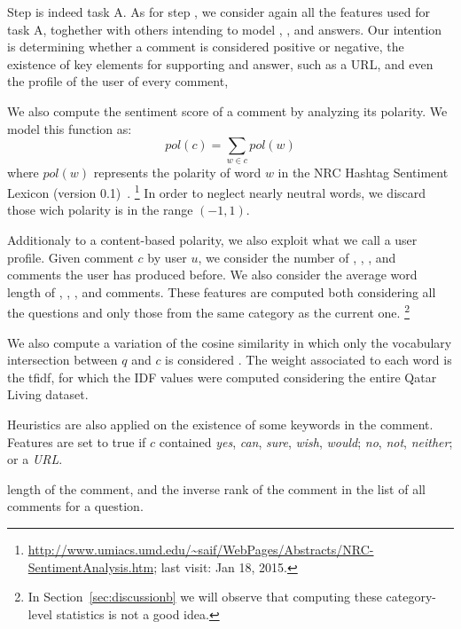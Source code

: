 Step \Ni is indeed task A. As for step \Nii, we consider again all the 
features used  for task A, toghether with others intending to model \yes, 
\no, and \unsure answers. Our intention is determining whether a comment is 
considered positive or negative, the existence of key elements for supporting 
and answer, such as a URL, and even the profile of the user of every comment, 

We also compute the sentiment score of a comment by analyzing its polarity. We 
model this function as:
\begin{equation}
pol(c) = \sum_{w\in c} pol(w) 
\end{equation}
%
where $pol(w)$ represents the polarity of word $w$ in the NRC Hashtag Sentiment 
Lexicon (version 0.1)~\cite{MohammadKZ2013}.%
\footnote{\url{
http://www.umiacs.umd.edu/~saif/WebPages/Abstracts/NRC-SentimentAnalysis.htm}; 
last visit: Jan 18, 2015.}
In order to neglect nearly 
neutral words, we discard those 
wich polarity is in the range $(-1,1)$. 


Additionaly to a content-based polarity, we also exploit what we call a user 
profile. Given comment $c$ by user $u$, we consider the number of 
\good, \bad, \pot, and \dial comments the user has produced before. We also 
consider the average word length of \good, \bad, \pot, and \dial comments.
These features are computed both considering all the questions and only those 
from the same category as the current one.%
\footnote{In Section~\ref{sec:discussionb} we will observe that computing these 
category-level statistics is not a good idea.}

We also compute a variation of the cosine similarity in which only the 
vocabulary intersection between $q$ and $c$ is considered . The 
weight associated to each word is the tfidf, for which the IDF values were 
computed considering the entire Qatar Living dataset.


Heuristics are also applied on the existence of some keywords in the comment. 
Features are set to true if $c$ contained
\Ni \textit{yes}, \textit{can}, \textit{sure}, \textit{wish}, \textit{would};
\Nii \textit{no}, \textit{not}, \textit{neither}; or 
\Niii  a \textit{URL}.





length of the comment, and the inverse rank of the comment in the list of all 
comments for a question.




